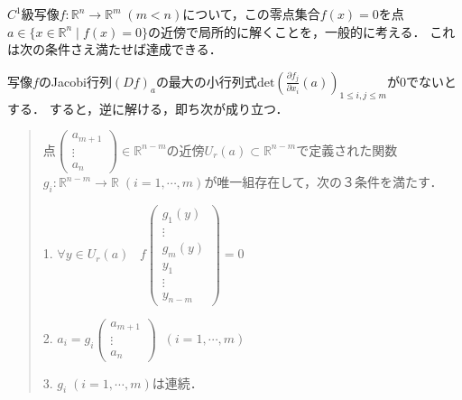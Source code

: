 \documentclass[uplatex, dvipdfmx]{jsreport}
\begin{document}
\begin{shadebox}\begin{theorem}
    $C^1$級写像$f:\mathbb{R}^n\to\mathbb{R}^m\; (m<n)$について，この零点集合$f(x)=0$を点$a\in\{x\in\mathbb{R}^n\mid f(x)=0\}$の近傍で局所的に解くことを，一般的に考える．
    これは次の条件さえ満たせば達成できる．

    写像$f$のJacobi行列$(Df)_a$の最大の小行列式$\mathrm{det}\left(\frac{\partial f_j}{\partial x_i}(a)\right)_{1\le i,j\le m}$が$0$でないとする．
    すると，逆に解ける，即ち次が成り立つ．
    \begin{quotation}
        点$\begin{pmatrix}a_{m+1} \\ \vdots \\ a_n\end{pmatrix}\in\mathbb{R}^{n-m}$の近傍$U_r(a)\subset\mathbb{R}^{n-m}$で定義された関数$g_i:\mathbb{R}^{n-m}\to\mathbb{R}\;(i=1,\cdots,m)$が唯一組存在して，次の３条件を満たす．
        
        1. $\forall y\in U_r(a)\;\;\; f\begin{pmatrix}g_1(y) \\ \vdots \\ g_m(y) \\ y_1 \\ \vdots \\ y_{n-m}\end{pmatrix} =0$
        
        2. $a_i=g_i\begin{pmatrix}a_{m+1} \\ \vdots \\ a_n\end{pmatrix}\;\; (i=1,\cdots,m)$

        3. $g_i\;(i=1,\cdots,m)$は連続．
    \end{quotation}
\end{theorem}\end{shadebox}
\end{document}
